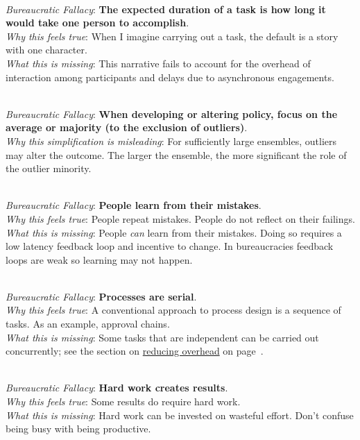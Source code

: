 \ \\
\textit{Bureaucratic Fallacy}: \textbf{The expected duration of a task is how long it would take one person to accomplish}.  \\
\textit{Why this feels true}: When I imagine carrying out a task, the default is a story with one character. \\
\textit{What this is missing}: This narrative fails to account for the overhead of interaction among participants and delays due to asynchronous engagements.


\ \\
\textit{Bureaucratic Fallacy}: \textbf{When developing or altering policy, focus on the average or majority (to the exclusion of outliers)}. \\
\textit{Why this simplification is misleading}: For sufficiently large ensembles, outliers  may alter the outcome. The larger the ensemble, the more significant the role of the outlier minority.

\ \\
\textit{Bureaucratic Fallacy}: \textbf{People learn from their mistakes}. \\
\textit{Why this feels true}: People repeat mistakes. People do not reflect on their failings. \\
\textit{What this is missing}: People \textit{can} learn from their mistakes. Doing so requires a low latency feedback loop and incentive to change. In bureaucracies feedback loops are weak so learning may not happen.

\ \\
\textit{Bureaucratic Fallacy}: \textbf{Processes are serial}.\\
\textit{Why this feels true}: A conventional approach to process design is a sequence of tasks. As an example, approval chains. \\
\textit{What this is missing}: Some tasks that are independent can be carried out concurrently; see the section on \hyperref[sec:reducing-overhead]{reducing overhead} on
page~\pageref{sec:reducing-overhead}.

\ \\
\textit{Bureaucratic Fallacy}: \textbf{Hard work creates results}.\\
\textit{Why this feels true}: Some results do require hard work. \\
\textit{What this is missing}: Hard work can be invested on wasteful effort. Don't confuse being busy with being productive.

